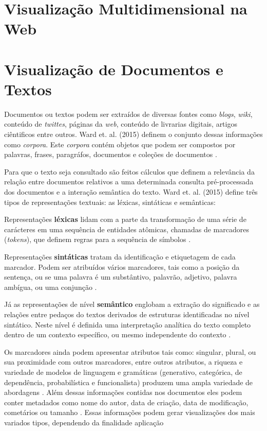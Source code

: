 \section{Visualização Multidimensional na Web}



\section{Visualização de Documentos e Textos}
\label{Visualizacao_texto}

Documentos ou textos podem ser extraídos de diversas fontes como \emph{blogs}, \emph{wiki}, conteúdo de \emph{twittes}, páginas da \emph{web}, conteúdo de livrarias digitais, artigos ciêntificos entre outros. Ward et. al. (2015) definem o conjunto dessas informações como \emph{corpora}.  Este \emph{corpora} contém objetos que podem ser compostos por palavras, frases, paragráfos, documentos e coleções de documentos \cite{ward2015interactive}.

Para que o texto seja consultado são feitos cálculos que definem a relevância da relação entre documentos relativos a uma determinada consulta pré-processada dos documentos e a interação semântica do texto.  Ward et. al. (2015)\cite{ward2015interactive} define três tipos de representações textuais: as léxicas, sintáticas e semânticas: 

Representações \textbf{léxicas} lidam com a parte da transformação de uma série de carácteres em uma sequência de entidades atômicas, chamadas de marcadores (\textit{tokens}), que definem regras para a sequência de símbolos \cite{ward2015interactive}. 

Representações \textbf{sintáticas} tratam da identificação e etiquetagem de cada marcador. Podem ser atribuídos vários marcadores, tais como a posição da sentença, ou se uma palavra é um substântivo, palavrão, adjetivo, palavra ambígua, ou uma conjunção \cite{ward2015interactive}. 

Já as representações de nível \textbf{semântico} englobam a extração do significado e as relações entre pedaços do textos derivados de estruturas identificadas no nível sintático. Neste nível é definida uma interpretação analítica do texto completo dentro de um contexto específico, ou mesmo independente do contexto \cite{ward2015interactive}.

Os marcadores ainda podem apresentar atributos tais como: singular, plural, ou sua proximidade com outros marcadores, entre outros atributos, a riqueza e variedade de modelos de linguagem e gramáticas (generativo, categórica, de dependência, probabilística e funcionalista) produzem uma ampla variedade de abordagens  \cite{ward2015interactive}.
Além dessas informações contidas nos documentos eles podem conter metadados como nome do autor, data de criação, data de modificação, cometários ou tamanho \cite{ward2015interactive}. Essas informações podem gerar visualizações dos mais variados tipos, dependendo da finalidade aplicação

